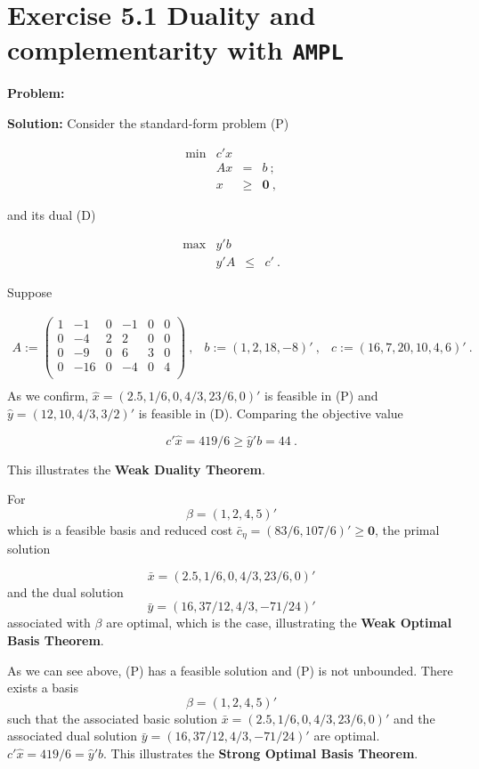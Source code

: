 \section{Exercise 5.1 Duality and complementarity with {\tt AMPL}}
\textbf{Problem:} 

\textbf{Solution:} Consider the standard-form problem (P) 

\[
\tag{P}
\begin{array}{rrcl}
 \min & c'x  &      &   \\
      &  Ax  &   =  & b~; \\
      &   x  & \geq & \mathbf{0}~,
\end{array}
\]

and its dual (D)

\[
\begin{array}{rrcl}
 \max & y'b  &      &   \\
      &  y'A  &   \leq  & c'~.
\end{array}
\tag{D}
\]

Suppose

\[
\begin{array}{ccc}
A  :=  \left(
  \begin{array}{cccccc}
    1 & -1 & 0 & -1 & 0 & 0 \\
    0 & -4 & 2 & 2 & 0 & 0 \\
    0 & -9 & 0 & 6 & 3 & 0 \\
    0 & -16 & 0 & -4 & 0 & 4 \\
  \end{array}
\right)~, &
b  :=  (1,2,18,-8)'~, &
c  :=  (16, 7, 20, 10, 4, 6)'~.\\
\end{array}
\]
As we confirm, $\hat{x} = (2.5,1/6,0,4/3,23/6,0)'$ is feasible in (P) and $\hat{y} = (12,10,4/3,3/2)'$ is feasible in (D). Comparing the objective value

$$c'\hat{x} = 419/6 \geq \hat{y}'b = 44~.$$

This illustrates the \textbf{Weak Duality Theorem}.

For $$\beta = (1, 2, 4, 5)'$$ which is a feasible basis and reduced cost $\bar{c}_\eta = (83/6,107/6)' \geq \mathbf{0}$, the primal solution 

$$\bar{x} = (2.5,1/6,0,4/3,23/6,0)'$$
and the dual solution $$\bar{y} = (16,37/12,4/3,-71/24)'$$ associated with $\beta$ are optimal, which is the case, illustrating the \textbf{Weak Optimal Basis Theorem}.

As we can see above, (P) has a feasible solution and (P) is not unbounded. There exists a basis $$\beta = (1, 2, 4, 5)'$$ such that the associated basic solution $\bar{x} = (2.5,1/6,0,4/3,23/6,0)'$ and the associated dual solution $\bar{y} = (16,37/12,4/3,-71/24)'$ are optimal. $c'\hat{x} = 419/6 = \hat{y}'b.$ This illustrates the \textbf{Strong Optimal Basis Theorem}.

